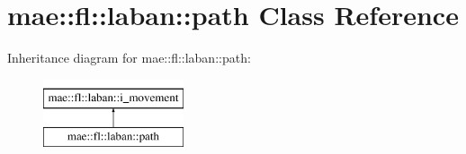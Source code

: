 \hypertarget{classmae_1_1fl_1_1laban_1_1path}{\section{mae\-:\-:fl\-:\-:laban\-:\-:path Class Reference}
\label{classmae_1_1fl_1_1laban_1_1path}
}
Inheritance diagram for mae\-:\-:fl\-:\-:laban\-:\-:path\-:\begin{figure}[H]
\begin{center}
\leavevmode
\includegraphics[height=2.000000cm]{classmae_1_1fl_1_1laban_1_1path}
\end{center}
\end{figure}
